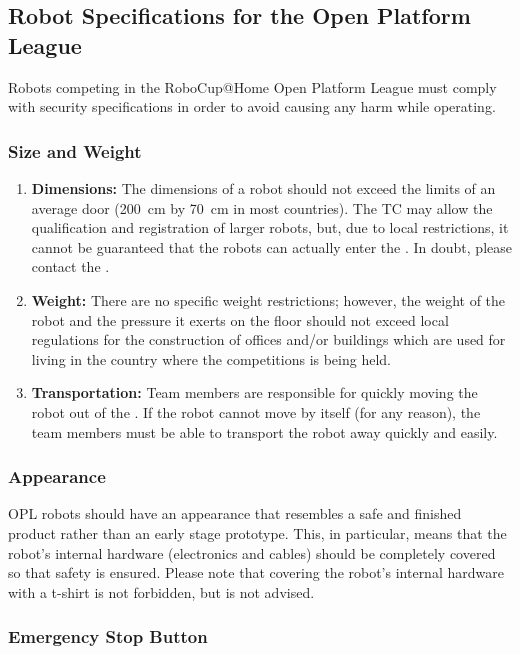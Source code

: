 \subsection{Robot Specifications for the Open Platform League }
Robots competing in the RoboCup@Home Open Platform League must comply with security specifications in order to avoid causing any harm while operating.

\subsubsection{Size and Weight}
\label{rule:robots_size}

\begin{enumerate}
	\item \textbf{Dimensions:} The dimensions of a robot should not exceed the limits of an average door (\SI{200}{\centi\meter} by \SI{70}{\centi\meter} in most countries).
	The TC may allow the qualification and registration of larger robots, but, due to local restrictions, it cannot be guaranteed that the robots can actually enter the \Arena{}.
	In doubt, please contact the \LOC.
	\item \textbf{Weight:} There are no specific weight restrictions; however, the weight of the robot and the pressure it exerts on the floor should not exceed local regulations for the construction of offices and/or buildings which are used for living in the country where the competitions is being held.
	\item \textbf{Transportation:} Team members are responsible for quickly moving the robot out of the \Arena.
	If the robot cannot move by itself (for any reason), the team members must be able to transport the robot away quickly and easily.
\end{enumerate}

\subsubsection{Appearance}
\label{rule:robots_appearance}

OPL robots should have an appearance that resembles a safe and finished product rather than an early stage prototype.
This, in particular, means that the robot's internal hardware (electronics and cables) should be completely covered so that safety is ensured.
Please note that covering the robot's internal hardware with a t-shirt is not forbidden, but is not advised.

\subsubsection{Emergency Stop Button}
\label{rule:robots_emergency_button}

